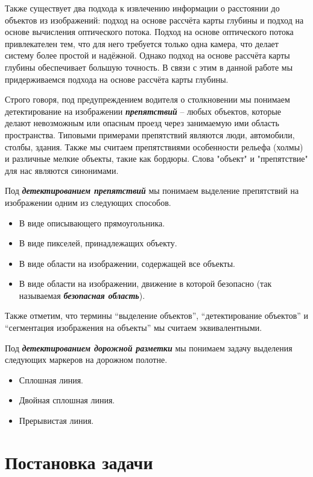 \documentclass[aps,%
14pt,%
final,%
oneside,
onecolumn,%
musixtex, %
superscriptaddress,%
centertags]{extarticle} %
\begin{document}
Также существует два подхода к извлечению информации о расстоянии до объектов из изображений: подход на основе рассчёта карты глубины и подход на основе вычисления оптического потока. Подход на основе оптического потока привлекателен тем, что для него требуется только одна камера, что делает систему более простой и надёжной. Однако подход на основе рассчёта карты глубины обеспечивает большую точность. В связи с этим в данной работе мы придерживаемся подхода на основе рассчёта карты глубины.

 Строго говоря, под предупреждением водителя о столкновении мы понимаем детектирование на изображении \textit{\textbf{препятствий}} -- любых объектов, которые делают невозможным или опасным проезд через занимаемую ими область пространства. Типовыми примерами препятствий являются люди, автомобили, столбы, здания. Также мы считаем препятствиями особенности рельефа (холмы) и различные мелкие объекты, такие как бордюры. Слова "объект" и "препятствие" для нас являются синонимами. 

Под \textit{\textbf{детектированием препятствий}} мы понимаем выделение препятствий на изображении одним из следующих способов.
\begin{itemize}
    \item В виде описывающего прямоугольника.
    \item В виде пикселей, принадлежащих объекту.
    \item В виде области на изображении, содержащей все объекты.
    \item В виде области на изображении, движение в которой безопасно (так называемая \textit{\textbf{безопасная область}}).
\end{itemize}
Также отметим, что термины ``выделение объектов'', ``детектирование объектов'' и ``сегментация изображения на объекты'' мы считаем эквивалентными.

Под \textit{\textbf{детектированием дорожной разметки}} мы понимаем задачу выделения следующих маркеров на дорожном полотне.
\begin{itemize}
    \item Сплошная линия.
    \item Двойная сплошная линия.
    \item Прерывистая линия.
\end{itemize}

\section{Постановка задачи}
\end{document}
